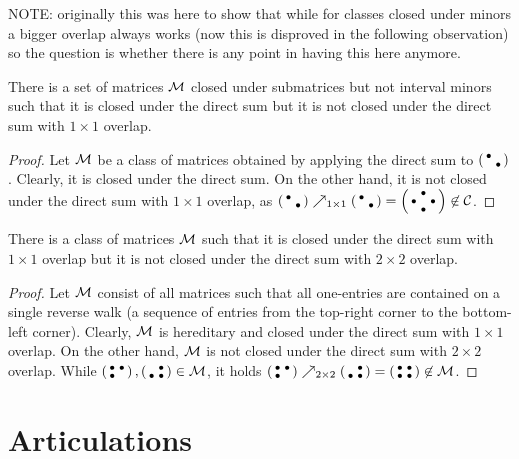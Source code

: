 NOTE: originally this was here to show that while for classes closed under minors a bigger overlap always works (now this is disproved in the following observation) so the question is whether there is any point in having this here anymore.
\begin{obs}
There is a set of matrices $\mathcal{M}$ closed under submatrices but not interval minors such that it is closed under the direct sum but it is not closed under the direct sum with $1\times1$ overlap.
\end{obs}
\begin{proof}
Let $\mathcal{M}$ be a class of matrices obtained by applying the direct sum to $\left(\begin{smallmatrix}\bullet& \\\ &\bullet\end{smallmatrix}\right)$. Clearly, it is closed under the direct sum. On the other hand, it is not closed under the direct sum with $1\times1$ overlap, as $\smm{\bullet& \\\ &\bullet}\dsum_{1\times1}\smm{\bullet& \\\ &\bullet}=\smm{ &\bullet& \\\bullet& &\bullet\\ &\bullet& }\not\in\class{C}$.
\end{proof}

\begin{obs}
There is a class of matrices $\mathcal{M}$ such that it is closed under the direct sum with $1\times1$ overlap but it is not closed under the direct sum with $2\times2$ overlap.
\end{obs}
\begin{proof}
Let $\mathcal{M}$ consist of all matrices such that all one-entries are contained on a single reverse walk (a sequence of entries from the top-right corner to the bottom-left corner). Clearly, $\mathcal{M}$ is hereditary and closed under the direct sum with $1\times1$ overlap.
On the other hand, $\mathcal{M}$ is not closed under the direct sum with $2\times2$ overlap. While $\left(\begin{smallmatrix}\bullet&\bullet\\\bullet& \end{smallmatrix}\right),\left(\begin{smallmatrix} &\bullet\\\bullet&\bullet\end{smallmatrix}\right)\in\mathcal{M}$, it holds $\left(\begin{smallmatrix}\bullet&\bullet\\\bullet& \end{smallmatrix}\right)\nearrow_{2\times2}\left(\begin{smallmatrix} &\bullet\\\bullet&\bullet\end{smallmatrix}\right)=\left(\begin{smallmatrix}\bullet&\bullet\\\bullet&\bullet\end{smallmatrix}\right)\not\in\mathcal{M}$.
\end{proof}

\section{Articulations}

